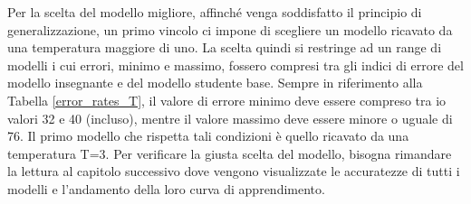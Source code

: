 Per la scelta del modello migliore, affinché venga soddisfatto il principio di generalizzazione, un primo vincolo ci impone di scegliere un modello ricavato da una temperatura maggiore di uno. La scelta quindi si restringe ad un range di modelli i cui errori, minimo e massimo, fossero compresi tra gli indici di errore del modello insegnante e del modello studente base. Sempre in riferimento alla Tabella \ref{error_rates_T}, il valore di errore minimo deve essere compreso tra io valori 32 e 40 (incluso), mentre il valore massimo deve essere minore o uguale di 76. Il primo modello che rispetta tali condizioni è quello ricavato da una temperatura T=3. Per verificare la giusta scelta del modello, bisogna rimandare la lettura al capitolo successivo dove vengono visualizzate le accuratezze di tutti i modelli e l'andamento della loro curva di apprendimento.

